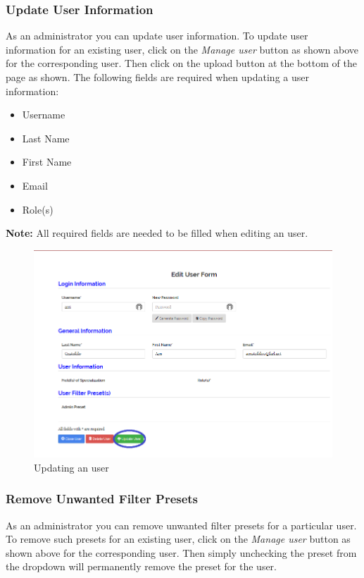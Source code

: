 \documentclass[fontsize=12pt,paper=letter,twoside]{scrartcl}
\begin{document}
\clearpage
\subsubsection{Update User Information}
As an administrator you can update user information. To update user information for an existing user, click on the \emph{Manage user} button as shown above for the corresponding user. Then click on the upload button at the bottom of the page as shown. The following fields are required when updating a user information:
\begin{itemize}
\item Username
\item Last Name
\item First Name
\item Email
\item Role(s)
\end{itemize}

\smallskip
\noindent \textbf{Note:} All required fields are needed to be filled when editing an user.

\begin{figure}[!htb]
\begin{center}
\includegraphics[width=.9\textwidth]{images/mu/update_user.png}
\end{center}
\caption{Updating an user}
\label{fig:update_user}
\end{figure}

\clearpage
\subsubsection{Remove Unwanted Filter Presets}
As an administrator you can remove unwanted filter presets for a particular user. To remove such presets for an existing user, click on the \emph{Manage user} button as shown above for the corresponding user. Then simply unchecking the preset from the dropdown will permanently remove the preset for the user.
\end{document}
